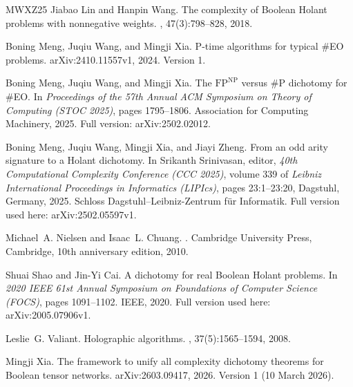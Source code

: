 \documentclass[11pt,letterpaper,onecolumn]{article}
\theoremstyle{plain}
\theoremstyle{definition}
\theoremstyle{remark}
\begin{document}
\begin{thebibliography}{MWXZ25}
Jiabao Lin and Hanpin Wang.
\newblock The complexity of {Boolean} {Holant} problems with nonnegative
  weights.
, 47(3):798--828, 2018.

Boning Meng, Juqiu Wang, and Mingji Xia.
\newblock P-time algorithms for typical {{\#EO}} problems.
\newblock arXiv:2410.11557v1, 2024.
\newblock Version 1.

Boning Meng, Juqiu Wang, and Mingji Xia.
\newblock The {$\mathrm{FP}^{\mathrm{NP}}$} versus {\#}{P} dichotomy for
  {\#}{EO}.
\newblock In {\em Proceedings of the 57th Annual ACM Symposium on Theory of
  Computing (STOC 2025)}, pages 1795--1806. Association for Computing
  Machinery, 2025.
\newblock Full version: arXiv:2502.02012.

Boning Meng, Juqiu Wang, Mingji Xia, and Jiayi Zheng.
\newblock From an odd arity signature to a {Holant} dichotomy.
\newblock In Srikanth Srinivasan, editor, {\em 40th Computational Complexity
  Conference (CCC 2025)}, volume 339 of {\em Leibniz International Proceedings
  in Informatics (LIPIcs)}, pages 23:1--23:20, Dagstuhl, Germany, 2025. Schloss
  Dagstuhl--Leibniz-Zentrum f{\"u}r Informatik.
\newblock Full version used here: arXiv:2502.05597v1.

Michael~A. Nielsen and Isaac~L. Chuang.
.
\newblock Cambridge University Press, Cambridge, 10th anniversary edition,
  2010.

Shuai Shao and Jin-Yi Cai.
\newblock A dichotomy for real {Boolean} {Holant} problems.
\newblock In {\em 2020 IEEE 61st Annual Symposium on Foundations of Computer
  Science (FOCS)}, pages 1091--1102. IEEE, 2020.
\newblock Full version used here: arXiv:2005.07906v1.

Leslie~G. Valiant.
\newblock Holographic algorithms.
, 37(5):1565--1594, 2008.

Mingji Xia.
\newblock The framework to unify all complexity dichotomy theorems for
  {Boolean} tensor networks.
\newblock arXiv:2603.09417, 2026.
\newblock Version 1 (10 March 2026).

\end{thebibliography}

\clearpage
\setcounter{section}{0}
\setcounter{equation}{0}
\setcounter{figure}{0}
\setcounter{table}{0}
\setcounter{footnote}{0}
\setcounter{page}{1}
\renewcommand{\thepage}{F-\arabic{page}}
\renewcommand{\thesection}{F.\arabic{section}}
\renewcommand{\theHsection}{full.\arabic{section}}
\renewcommand{\theequation}{F.\arabic{equation}}
\renewcommand{\theHequation}{full.\arabic{equation}}
\renewcommand{\thefigure}{F.\arabic{figure}}
\renewcommand{\theHfigure}{full.\arabic{figure}}
\renewcommand{\thetable}{F.\arabic{table}}
\renewcommand{\theHtable}{full.\arabic{table}}
\end{document}
